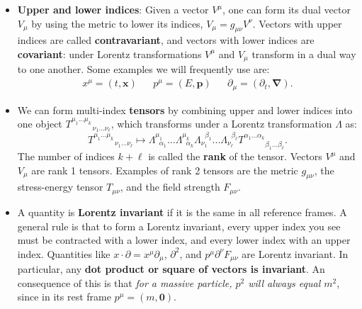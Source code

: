\documentclass[12pt, oneside]{article}   	%
\theoremstyle{definition}
\begin{document}
\begin{itemize}



	\item \textbf{Upper and lower indices}: Given a vector $V^\mu$, one can form its dual vector $V_\mu$ by using the 
	metric to lower its indices, $V_\mu = g_{\mu\nu} V^\nu$. Vectors with upper indices are called \textbf{contravariant}, 
	and vectors with lower indices are \textbf{covariant}: under Lorentz transformations $V^\mu$ and $V_\mu$ transform 
	in a dual way to one another. Some examples we will frequently use are:
	\begin{align}
		x^\mu = (t, \bm x) && p^\mu = (E, \bm p) && \partial_\mu = (\partial_t, \bm \nabla).
	\end{align}

	\item We can form multi-index \textbf{tensors} by combining upper and lower indices into 
	one object $T^{\mu_1 ... \mu_k}_{\;\;\;\;\;\;\;\;\;\;\;\nu_1 ... \nu_\ell}$, which transforms under a Lorentz transformation $\Lambda$ as:
	\begin{equation}
		T^{\mu_1 ... \mu_k}_{\;\;\;\;\;\;\;\;\;\;\;\nu_1 ... \nu_\ell}\mapsto \Lambda^{\mu_1}_{\;\;\alpha_1} ... \Lambda^{\mu_k}_{\;\;\alpha_k} 
		\Lambda_{\nu_1}^{\;\;\beta_1} ... \Lambda_{\nu_\ell}^{\;\;\beta_\ell} T^{\alpha_1 ... \alpha_k}_{\;\;\;\;\;\;\;\;\;\;\;\beta_1 ... \beta_\ell}.
	\end{equation}
	The number of indices $k + \ell$ is called the \textbf{rank} of the tensor. Vectors $V^\mu$ and $V_\mu$ are 
	rank 1 tensors. Examples of rank 2 tensors are the metric $g_{\mu\nu}$, the stress-energy tensor $T_{\mu\nu}$, 
	and the field strength $F_{\mu\nu}$.
	
	\item A quantity is \textbf{Lorentz invariant} if it is the same in all reference frames. A general rule is that to form 
	a Lorentz invariant, every upper index you see must be contracted with a lower index, and every lower 
	index with an upper index. Quantities like $x\cdot \partial = x^\mu\partial_\mu$, $\partial^2$, and $p^\mu \partial^\nu F_{\mu\nu}$ are 
	Lorentz invariant. In particular, any \textbf{dot product or square of vectors is invariant}. An consequence of this is that \textit{for a 
	massive particle, $p^2$ will always equal $m^2$}, since in its rest frame $p^\mu = ( m,  \bm 0 )$. 
	

\end{itemize}
\end{document}
